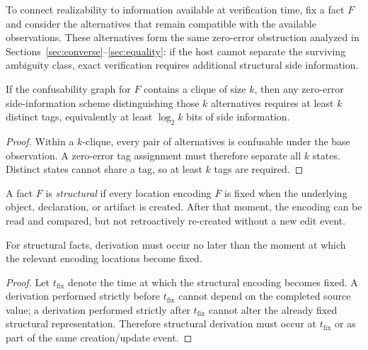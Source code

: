 To connect realizability to information available at verification time, fix a fact $F$ and consider the alternatives that remain compatible with the available observations. These alternatives form the same zero-error obstruction analyzed in Sections~\ref{sec:converse}--\ref{sec:equality}: if the host cannot separate the surviving ambiguity class, exact verification requires additional structural side information.

\begin{lemma}\label{lem:confusability-clique}
If the confusability graph for $F$ contains a clique of size $k$, then any zero-error side-information scheme distinguishing those $k$ alternatives requires at least $k$ distinct tags, equivalently at least $\log_2 k$ bits of side information.
\end{lemma}

\begin{proof}
Within a $k$-clique, every pair of alternatives is confusable under the base observation. A zero-error tag assignment must therefore separate all $k$ states. Distinct states cannot share a tag, so at least $k$ tags are required.
\end{proof}

\begin{definition}\label{def:structural-fact-req}
A fact $F$ is \emph{structural} if every location encoding $F$ is fixed when the underlying object, declaration, or artifact is created. After that moment, the encoding can be read and compared, but not retroactively re-created without a new edit event.
\end{definition}

\begin{theorem}\label{thm:timing-forces}
For structural facts, derivation must occur no later than the moment at which the relevant encoding locations become fixed.
\end{theorem}

\begin{proof}
Let $t_{\mathrm{fix}}$ denote the time at which the structural encoding becomes fixed. A derivation performed strictly before $t_{\mathrm{fix}}$ cannot depend on the completed source value; a derivation performed strictly after $t_{\mathrm{fix}}$ cannot alter the already fixed structural representation. Therefore structural derivation must occur at $t_{\mathrm{fix}}$ or as part of the same creation/update event.
\end{proof}

